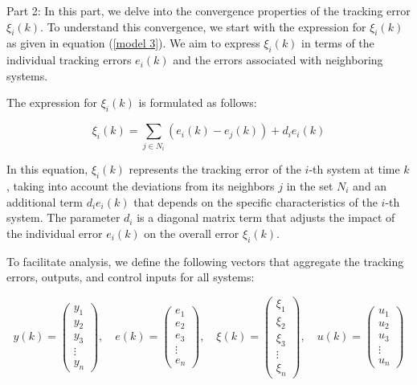 \documentclass[journal,onecolumn]{IEEEtran}
\begin{document}
Part 2: In this part, we delve into the convergence properties of the tracking error \(\xi_i(k)\). To understand this convergence, we start with the expression for \(\xi_i(k)\) as given in equation (\ref{model 3}). We aim to express \(\xi_i(k)\) in terms of the individual tracking errors \(e_i(k)\) and the errors associated with neighboring systems.

The expression for \(\xi_i(k)\) is formulated as follows:

\begin{equation}
    \label{model 32}
    \xi_i(k) = \sum_{j \in N_i} (e_i(k) - e_j(k)) + d_i e_i(k)
\end{equation}

In this equation, \(\xi_i(k)\) represents the tracking error of the \(i\)-th system at time \(k\), taking into account the deviations from its neighbors \(j\) in the set \(N_i\) and an additional term \(d_i e_i(k)\) that depends on the specific characteristics of the \(i\)-th system. The parameter \(d_i\) is a diagonal matrix term that adjusts the impact of the individual error \(e_i(k)\) on the overall error \(\xi_i(k)\).

To facilitate analysis, we define the following vectors that aggregate the tracking errors, outputs, and control inputs for all systems:

\[
y(k) = \begin{pmatrix} y_1 \\ y_2 \\ y_3 \\ \vdots \\ y_n \end{pmatrix}, \quad 
e(k) = \begin{pmatrix} e_1 \\ e_2 \\ e_3 \\ \vdots \\ e_n \end{pmatrix}, \quad 
\xi(k) = \begin{pmatrix} \xi_1 \\ \xi_2 \\ \xi_3 \\ \vdots \\ \xi_n \end{pmatrix}, \quad 
u(k) = \begin{pmatrix} u_1 \\ u_2 \\ u_3 \\ \vdots \\ u_n \end{pmatrix}
\]
\end{document}

